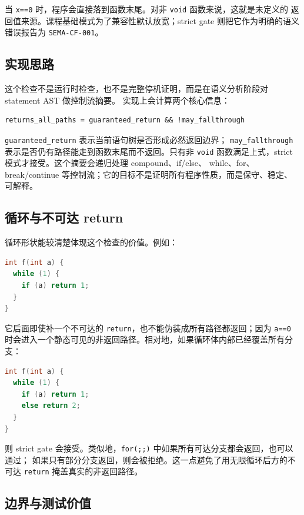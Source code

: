 \documentclass[UTF8,a4paper,11pt]{ctexart}
\begin{document}
当 \texttt{x==0} 时，程序会直接落到函数末尾。对非 \texttt{void} 函数来说，这就是未定义的
返回值来源。课程基础模式为了兼容性默认放宽；strict gate 则把它作为明确的语义错误报告为
\texttt{SEMA-CF-001}。

\subsection{实现思路}

这个检查不是运行时检查，也不是完整停机证明，而是在语义分析阶段对 statement AST 做控制流摘要。
实现上会计算两个核心信息：

\begin{lstlisting}[language={}]
returns_all_paths = guaranteed_return && !may_fallthrough
\end{lstlisting}

\texttt{guaranteed\_return} 表示当前语句树是否形成必然返回边界；
\texttt{may\_fallthrough} 表示是否仍有路径能走到函数末尾而不返回。只有非
\texttt{void} 函数满足上式，strict 模式才接受。这个摘要会递归处理 compound、if/else、
while、for、break/continue 等控制流；它的目标不是证明所有程序性质，而是保守、稳定、
可解释。

\subsection{循环与不可达 return}

循环形状能较清楚体现这个检查的价值。例如：

\begin{lstlisting}[language=C]
int f(int a) {
  while (1) {
    if (a) return 1;
  }
}
\end{lstlisting}

它后面即使补一个不可达的 \texttt{return}，也不能伪装成所有路径都返回；因为
\texttt{a==0} 时会进入一个静态可见的非返回路径。相对地，如果循环体内部已经覆盖所有分支：

\begin{lstlisting}[language=C]
int f(int a) {
  while (1) {
    if (a) return 1;
    else return 2;
  }
}
\end{lstlisting}

则 strict gate 会接受。类似地，\texttt{for(;;)} 中如果所有可达分支都会返回，也可以通过；
如果只有部分分支返回，则会被拒绝。这一点避免了用无限循环后方的不可达
\texttt{return} 掩盖真实的非返回路径。

\subsection{边界与测试价值}
\end{document}
